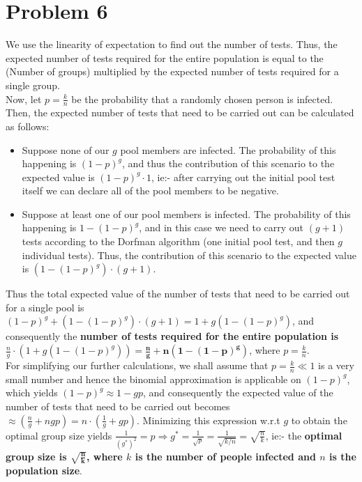 \documentclass[a4paper,11pt]{article}
\numberwithin{definition}{section}
\numberwithin{mytheorem}{subsection}
\begin{document}
\section{Problem 6}
We use the linearity of expectation to find out the number of tests. Thus, the expected number of tests required for the entire population is equal to the
(Number of groups) multiplied by the expected number of tests required for a single group.\\
Now, let $p = \frac{k}{n}$ be the probability that a randomly chosen person is infected. Then, the expected number of tests that need to be carried out can be calculated as follows:
\begin{itemize}
    \item Suppose none of our $g$ pool members are infected. The probability of this happening is $(1-p)^g$, and thus the contribution of this scenario to the expected value is $(1-p)^g\cdot 1$, ie:- after carrying out the initial pool test itself we can declare all of the pool members to be negative.
    \item Suppose at least one of our pool members is infected. The probability of this happening is $1-(1-p)^g$, and in this case we need to carry out $(g+1)$ tests according to the Dorfman algorithm (one initial pool test, and then $g$ individual tests). Thus, the contribution of this scenario to the expected value is $(1-(1-p)^g)\cdot (g+1)$.
\end{itemize}
Thus the total expected value of the number of tests that need to be carried out for a single pool is $(1-p)^g + (1-(1-p)^g)\cdot (g+1) = 1 + g(1-(1-p)^g)$, and consequently the \textbf{number of tests required for the entire population is} $\frac{n}{g}\cdot (1 + g(1-(1-p)^g)) = \boldsymbol{\frac{n}{g} + n(1-(1-p)^g)}$, where $p = \frac{k}{n}$.\\
For simplifying our further calculations, we shall assume that $p = \frac{k}{n} \ll 1$ is a very small number and hence the binomial approximation is applicable on $(1-p)^g$, which yields $(1-p)^g\approx 1-gp$, and consequently the expected value of the number of tests that need to be carried out becomes $\approx (\frac{n}{g} + ngp) = n\cdot (\frac{1}{g} + gp)$. Minimizing this expression w.r.t $g$ to obtain the optimal group size yields $\frac{1}{(g^*)^2} = p\Rightarrow g^* = \frac{1}{\sqrt{p}} = \frac{1}{\sqrt{k/n}} = \sqrt{\frac{n}{k}}$, ie:- the \textbf{optimal group size is $\boldsymbol{\sqrt{\frac{n}{k}}}$, where $k$ is the number of people infected and $n$ is the population size}.
\end{document}

